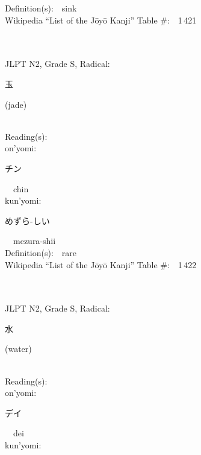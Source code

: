 \begin{multicols}{2}
Definition(s):\ \ sink \\
Wikipedia ``List of the J\=oy\=o Kanji'' Table \#:\ \ 1\,421 \\
\ \ \\
{\fontsize{34pt}{40pt}  }\ \ \\  %
{JLPT N2, Grade S, Radical:\ \ {\begin{CJK}{UTF8}{min} 玉 \end{CJK}} (jade) } \\
Reading(s):\ \ \\
{\hspace*{1em}}on'yomi:\ \ \\
{\hspace*{2em}}{\begin{CJK}{UTF8}{min} チン \end{CJK}}\ \ chin\ \ \\
{\hspace*{1em}}kun'yomi:\ \ \\
{\hspace*{2em}}{\begin{CJK}{UTF8}{min} めずら-しい \end{CJK}}\ \ mezura-shii\ \ \\
Definition(s):\ \ rare \\
Wikipedia ``List of the J\=oy\=o Kanji'' Table \#:\ \ 1\,422 \\
\ \ \\
{\fontsize{34pt}{40pt}  }\ \ \\  %
{JLPT N2, Grade S, Radical:\ \ {\begin{CJK}{UTF8}{min} 水 \end{CJK}} (water) } \\
Reading(s):\ \ \\
{\hspace*{1em}}on'yomi:\ \ \\
{\hspace*{2em}}{\begin{CJK}{UTF8}{min} デイ \end{CJK}}\ \ dei\ \ \\
{\hspace*{1em}}kun'yomi:\ \ \\

\end{multicols}
